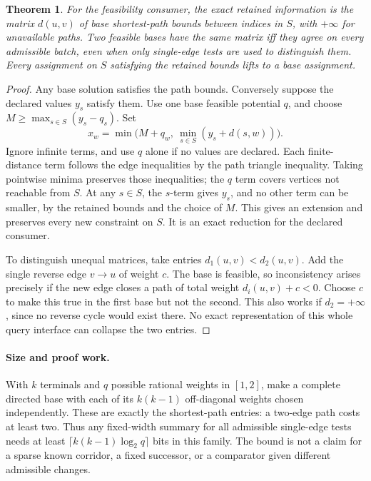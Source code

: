 \documentclass[11pt]{article}
\newtheorem{theorem}{Theorem}
\begin{document}
\begin{theorem}
For the feasibility consumer, the exact retained information is the
matrix \(d(u,v)\) of base shortest-path bounds between indices in \(S\),
with \(+\infty\) for unavailable paths. Two feasible bases have the
same matrix iff they agree on every admissible batch, even when only
single-edge tests are used to distinguish them. Every assignment on
\(S\) satisfying the retained bounds lifts to a base assignment.
\end{theorem}
\begin{proof}
Any base solution satisfies the path bounds. Conversely suppose the
declared values \(y_s\) satisfy them. Use one base feasible potential
\(q\), and choose \(M\ge\max_{s\in S}(y_s-q_s)\). Set
\[
   x_w=\min\bigl(M+q_w,\ \min_{s\in S}(y_s+d(s,w))\bigr).
\]
Ignore infinite terms, and use \(q\) alone if no values are declared.
Each finite-distance term follows the edge inequalities by the path
triangle inequality. Taking pointwise minima preserves those
inequalities; the \(q\) term covers vertices not reachable from \(S\).
At any \(s\in S\), the \(s\)-term gives \(y_s\), and no other term
can be smaller, by the retained bounds and the choice of \(M\).
This gives an extension and preserves every new constraint on \(S\).
It is an exact reduction for the declared consumer.

To distinguish unequal matrices, take entries \(d_1(u,v)<d_2(u,v)\).
Add the single reverse edge \(v\to u\) of weight \(c\).
The base is feasible, so inconsistency arises precisely if the new
edge closes a path of total weight \(d_i(u,v)+c<0\). Choose \(c\)
to make this true in the first base but not the second. This also
works if \(d_2=+\infty\), since no reverse cycle would exist there.
No exact representation of this whole query interface can collapse
the two entries.
\end{proof}

\paragraph{Size and proof work.}
With \(k\) terminals and \(q\) possible rational weights in \([1,2]\),
make a complete directed base with each of its \(k(k-1)\) off-diagonal
weights chosen independently. These are exactly the shortest-path
entries: a two-edge path costs at least two. Thus any fixed-width
summary for all admissible single-edge tests needs at least
\(\lceil k(k-1)\log_2 q\rceil\) bits in this family. The bound is
not a claim for a sparse known corridor, a fixed successor,
or a comparator given different admissible changes.
\end{document}

